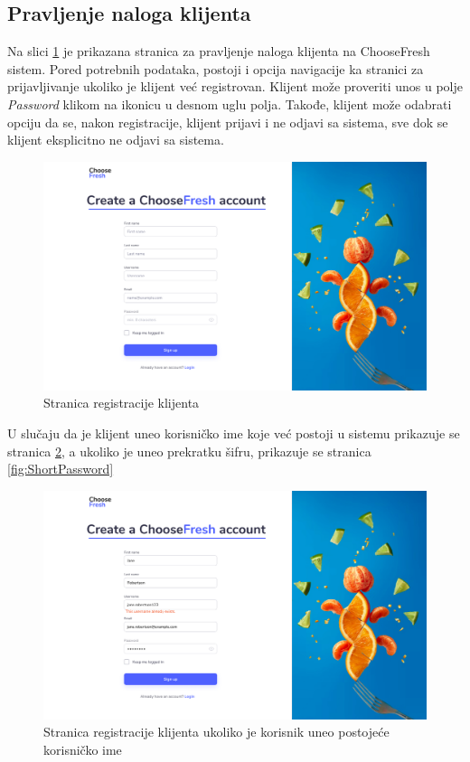 \subsection{Pravljenje naloga klijenta}

Na slici \ref{fig:SignUp} je prikazana stranica za pravljenje naloga klijenta na ChooseFresh sistem. Pored potrebnih podataka, postoji i opcija navigacije ka stranici za prijavljivanje ukoliko je klijent već registrovan. Klijent može proveriti unos u polje \textit{Password} klikom na ikonicu u desnom uglu polja. Takođe, klijent može odabrati opciju da se, nakon registracije, klijent prijavi i ne odjavi sa sistema, sve dok se klijent eksplicitno ne odjavi sa sistema.

\begin{figure}[H]
	\begin{center}
		\includegraphics[width=\textwidth]{UI/SignUp.jpg}
    		\caption{Stranica registracije klijenta}
    \label{fig:SignUp}
    \end{center}
\end{figure}


U slučaju da je klijent uneo korisničko ime koje već postoji u sistemu prikazuje se stranica \ref{fig:UsernameExists}, a ukoliko je uneo prekratku šifru, prikazuje se stranica \ref{fig:ShortPassword}  

\begin{figure}[H]
	\begin{center}
		\includegraphics[width=\textwidth]{UI/UsernameExistsSignUp.jpg}
    		\caption{Stranica registracije klijenta ukoliko je korisnik uneo postojeće korisničko ime}
    \label{fig:UsernameExists}
    \end{center}
\end{figure}

